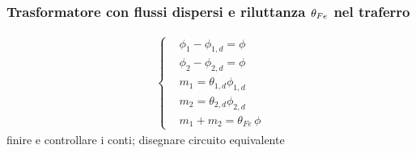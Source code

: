 \documentclass[letterpaper,10pt,english]{jupyterBook}
\begin{document}
\subsubsection{Trasformatore con flussi dispersi e riluttanza \protect\(\theta_{Fe}\protect\) nel traferro}
\label{\detokenize{ch/circuits-electromagnetic-transformer:trasformatore-con-flussi-dispersi-e-riluttanza-theta-fe-nel-traferro}}\begin{equation*}
\begin{split}\begin{cases}
 & \phi_{1} - \phi_{1,d} = \phi \\
 & \phi_{2} - \phi_{2,d} = \phi \\
 & m_{1} = \theta_{1,d} \phi_{1,d} \\
 & m_{2} = \theta_{2,d} \phi_{2,d} \\
 & m_1   + m_{2} = \theta_{Fe} \, \phi
\end{cases}\end{split}
\end{equation*}
\sphinxAtStartPar
{} finire e controllare i conti; disegnare circuito equivalente



\sphinxstepscope
\end{document}
